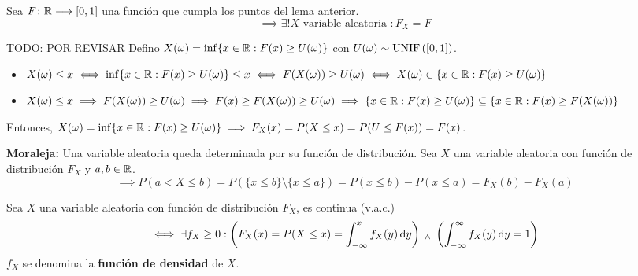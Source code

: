 \begin{teo}
	Sea $F \colon \mathbb{R} \longrightarrow [0, 1]$ una función que cumpla los puntos del lema anterior.
	\[\implies \exists! X \text{ variable aleatoria } : F_X = F\]
	\begin{dem} TODO: POR REVISAR
		Defino $X(\omega) = \inf\{x\in\mathbb{R} : F(x) \geq U(\omega)\}$ con $U(\omega) \sim \operatorname{UNIF}\left([0,1]\right)$.
		\begin{itemize}
			\item $X(\omega) \leq x \iff \inf\{x\in\mathbb{R} : F(x) \geq U(\omega)\} \leq x \iff F(X(\omega)) \geq U(\omega) \iff X(\omega) \in \{x\in\mathbb{R} : F(x) \geq U(\omega)\}$
			\item $X(\omega) \leq x \implies F(X(\omega)) \geq U(\omega) \implies F(x) \geq F(X(\omega)) \geq U(\omega) \implies \{x\in\mathbb{R} : F(x) \geq U(\omega)\} \subseteq \{x\in\mathbb{R} : F(x) \geq F(X(\omega))\}$
		\end{itemize}
		Entonces, $X(\omega) = \inf\{x\in\mathbb{R} : F(x) \geq U(\omega)\} \implies F_X(x) = P(X\leq x) = P(U\leq F(x)) = F(x)$.
	\end{dem}
\end{teo}
\textbf{Moraleja:} Una variable aleatoria queda determinada por su función de distribución.
Sea $X$ una variable aleatoria con función de distribución $F_X$ y $a,b\in \mathbb{R}$.
\[\implies P(a<X\leq b)=P(\{x\leq b\}\setminus \{x\leq a\}) = P(x\leq b) - P(x\leq a) = F_X(b)-F_X(a)\]
\begin{defn}
	Sea $X$ una variable aleatoria con función de distribución $F_X$, es continua (v.a.c.)
	\[\iff \exists f_X \geq 0 : \left(F_X(x) = P(X\leq x)=\int_{-\infty}^{x} f_X(y) \odif{y}\right) \we \left(\int_{-\infty}^{\infty} f_X(y) \odif{y}=1\right)\]
	$f_X$ se denomina la \textbf{función de densidad} de $X$.
\end{defn}


